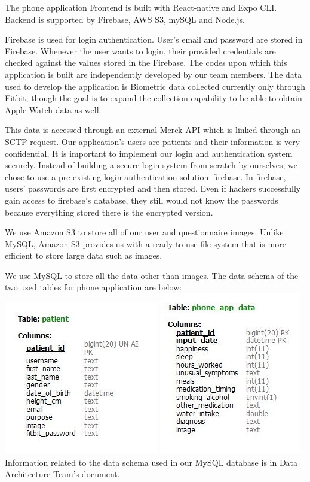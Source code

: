 \documentclass[]{book}
\begin{document}
The phone application Frontend is built with React-native and Expo CLI.
Backend is supported by Firebase, AWS S3, mySQL and Node.js.

Firebase is used for login authentication. User's email and password are
stored in Firebase. Whenever the user wants to login, their provided
credentials are checked against the values stored in the Firebase. The
codes upon which this application is built are independently developed
by our team members. The data used to develop the application is
Biometric data collected currently only through Fitbit, though the goal
is to expand the collection capability to be able to obtain Apple Watch
data as well.

This data is accessed through an external Merck API which is linked
through an SCTP request. Our application's users are patients and their
information is very confidential, It is important to implement our login
and authentication system securely. Instead of building a secure login
system from scratch by ourselves, we chose to use a pre-existing login
authentication solution--firebase. In firebase, users' passwords are
first encrypted and then stored. Even if hackers successfully gain
access to firebase's database, they still would not know the passwords
because everything stored there is the encrypted version.

We use Amazon S3 to store all of our user and questionnaire images.
Unlike MySQL, Amazon S3 provides us with a ready-to-use file system that
is more efficient to store large data such as images.

We use MySQL to store all the data other than images. The data schema of
the two used tables for phone application are below:
\includegraphics{./phone_app_doc_images/sql_patient_table.JPG}
\includegraphics{./phone_app_doc_images/sql_phone_app_data_table.JPG}
Information related to the data schema used in our MySQL database is in
Data Architecture Team's document.
\end{document}
